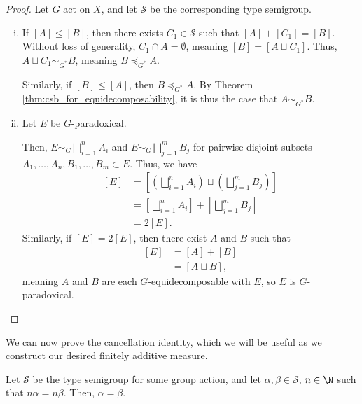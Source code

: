 \documentclass[10pt]{mypackage2}
\begin{document}
\begin{proof}
  Let $G$ act on $X$, and let $\mathcal{S}$ be the corresponding type semigroup.
  \begin{enumerate}[(i)]
    \item If $\left[A\right]\leq \left[B\right]$, then there exists $C_1\in \mathcal{S}$ such that $\left[A\right] + \left[C_1\right] = \left[B\right]$. Without loss of generality, $C_1\cap A= \emptyset$, meaning $\left[B\right] = \left[A\sqcup C_1\right]$. Thus, $A\sqcup C_1 \sim_{G^{\ast}} B$, meaning $B\preceq_{G^{\ast}}A$.\newline

      Similarly, if $\left[B\right]\leq \left[A\right]$, then $B\preceq_{G^{\ast}}A$. By Theorem \ref{thm:csb_for_equidecomposability}, it is thus the case that $A\sim_{G^{\ast}}B$.
    \item Let $E$ be $G$-paradoxical. \newline

      Then, $E\sim_{G}\bigsqcup_{i=1}^{n}A_i$ and $E \sim_{G}\bigsqcup_{j=1}^{m}B_j$ for pairwise disjoint subsets $A_1,\dots,A_n,B_1,\dots,B_m\subset E$. Thus, we have
      \begin{align*}
        \left[E\right] &= \left[\left(\bigsqcup_{i=1}^{n}A_i\right)\sqcup \left(\bigsqcup_{j=1}^{m}B_j\right)\right]\\
                       &= \left[\bigsqcup_{i=1}^{n}A_i\right] + \left[\bigsqcup_{j=1}^{m}B_j\right]\\
                       &= 2\left[E\right].
      \end{align*}
      Similarly, if $\left[E\right] = 2\left[E\right]$, then there exist $A$ and $B$ such that
      \begin{align*}
        \left[E\right] &= \left[A\right] + \left[B\right]\\
                       &= \left[A\sqcup B\right],
      \end{align*}
      meaning $A$ and $B$ are each $G$-equidecomposable with $E$, so $E$ is $G$-paradoxical.
  \end{enumerate}
\end{proof}
We can now prove the cancellation identity, which we will be useful as we construct our desired finitely additive measure.
\begin{theorem}
  Let $\mathcal{S}$ be the type semigroup for some group action, and let $\alpha,\beta\in \mathcal{S}$, $n\in \N$ such that $n\alpha = n\beta$. Then, $\alpha = \beta$.
\end{theorem}
\end{document}
